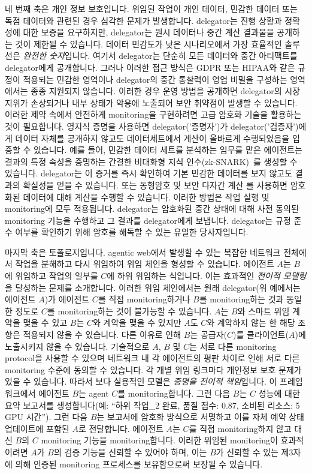\documentclass[11pt, a4paper, twocolumn, copyright, goog]{google}
\begin{document}
네 번째 축은 개인 정보 보호입니다. 위임된 작업이 개인 데이터, 민감한 데이터 또는 독점 데이터와 관련된 경우 심각한 문제가 발생합니다. delegator는 진행 상황과 정확성에 대한 보증을 요구하지만, delegator는 원시 데이터나 중간 계산 결과물을 공개하는 것이 제한될 수 있습니다. 데이터 민감도가 낮은 시나리오에서 가장 효율적인 솔루션은 \emph{완전한 숫자}입니다. 여기서 delegator는 단순히 모든 데이터와 중간 아티팩트를 delegator에게 공개합니다. 그러나 이러한 접근 방식은 GDPR 또는 HIPAA와 같은 규정이 적용되는 민감한 영역이나 delegator의 중간 통찰력이 영업 비밀을 구성하는 영역에서는 종종 지원되지 않습니다. 이러한 경우 운영 방법을 공개하면 delegator의 시장 지위가 손상되거나 내부 상태가 악용에 노출되어 보안 취약점이 발생할 수 있습니다. 이러한 제약 속에서 안전하게 monitoring을 구현하려면 고급 암호화 기술을 활용하는 것이 필요합니다. 영지식 증명을 사용하면 delegator('증명자')가 delegator('검증자')에게 데이터 자체를 공개하지 않고도 데이터세트에서 계산이 올바르게 수행되었음을 입증할 수 있습니다. 예를 들어, 민감한 데이터 세트를 분석하는 임무를 맡은 에이전트는 결과의 특정 속성을 증명하는 간결한 비대화형 지식 인수(zk-SNARK)~\citep{bitansky2013succinct, petkus2019and}를 생성할 수 있습니다. delegator는 이 증거를 즉시 확인하여 기본 민감한 데이터를 보지 않고도 결과의 확실성을 얻을 수 있습니다. 또는 동형암호 \citep{acar2018survey} 및 보안 다자간 계산 \citep{goldreich1998secure, knott2021crypten}를 사용하면 암호화된 데이터에 대해 계산을 수행할 수 있습니다. 이러한 방법은 작업 실행 및 monitoring에 모두 적용됩니다. delegator는 암호화된 중간 상태에 대해 사전 동의된 monitoring 기능을 수행하고 그 결과를 delegator에게 보냅니다. delegator는 규정 준수 여부를 확인하기 위해 암호를 해독할 수 있는 유일한 당사자입니다.

마지막 축은 토폴로지입니다. agentic web에서 발생할 수 있는 복잡한 네트워크 전체에서 작업을 분해하고 다시 위임하여 위임 체인을 형성할 수 있습니다. 에이전트 $A$는 $B$에 위임하고 작업의 일부를 $C$에 하위 위임하는 식입니다. 이는 효과적인 \emph{전이적 모델링}을 달성하는 문제를 소개합니다. 이러한 위임 체인에서는 원래 delegator(위 예에서는 에이전트 $A$)가 에이전트 $C$를 직접 monitoring하거나 $B$를 monitoring하는 것과 동일한 정도로 $C$를 monitoring하는 것이 불가능할 수 있습니다. $A$는 $B$와 스마트 위임 계약을 맺을 수 있고 $B$는 $C$와 계약을 맺을 수 있지만 $A$도 $C$와 계약하지 않는 한 해당 조항은 적용되지 않을 수 있습니다. 다른 이유로 인해 $B$는 공급자($C$)를 클라이언트($A$)에 노출시키지 않을 수 있습니다. 기술적으로 $A$, $B$ 및 $C$는 서로 다른 monitoring protocol을 사용할 수 있으며 네트워크 내 각 에이전트의 평판 차이로 인해 서로 다른 monitoring 수준에 동의할 수 있습니다. 각 개별 위임 링크마다 개인정보 보호 문제가 있을 수 있습니다. 따라서 보다 실용적인 모델은 \emph{증명을 전이적 책임}입니다. 이 프레임워크에서 에이전트 $B$는 agent $C$를 monitoring합니다. 그런 다음 $B$는 $C$ 성능에 대한 요약 보고서를 생성합니다(예: ``하위 작업\_2 완료, 품질 점수: 0.87, 소비된 리소스: 5 GPU 시간''). 그런 다음 $B$는 보고서에 암호화 방식으로 서명하고 이를 자체 예약 상태 업데이트에 포함된 $A$로 전달합니다. 에이전트 $A$는 $C$를 직접 monitoring하지 않고 대신 $B$의 $C$ monitoring 기능을 monitoring합니다. 이러한 위임된 monitoring이 효과적이려면 $A$가 $B$의 검증 기능을 신뢰할 수 있어야 하며, 이는 $B$가 신뢰할 수 있는 제3자에 의해 인증된 monitoring 프로세스를 보유함으로써 보장될 수 있습니다.
\end{document}

